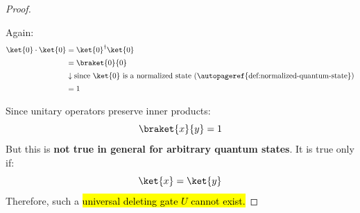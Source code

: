 \begin{proof}
\begin{itemize}
        Again:
        \begin{align*}
            \ket{0}\cdot\ket{0}
            &=
            \ket{0}^{\dagger}\ket{0} \\[.2em]
            &=
            \braket{0}{0} \\[.2em]
            &\downarrow \text{since $\ket{0}$ is a normalized state (\autopageref{def:normalized-quantum-state})} \\[.2em]
            &=
            1
        \end{align*}
    \end{itemize}
    Since unitary operators preserve inner products:
    \begin{equation*}
        \braket{x}{y}=1
    \end{equation*}
    But this is \textbf{not true in general for arbitrary quantum states}. It is true only if:
    \begin{equation*}
        \ket{x}=\ket{y}
    \end{equation*}
    Therefore, such a \hl{universal deleting gate $U$ cannot exist.}
\end{proof}